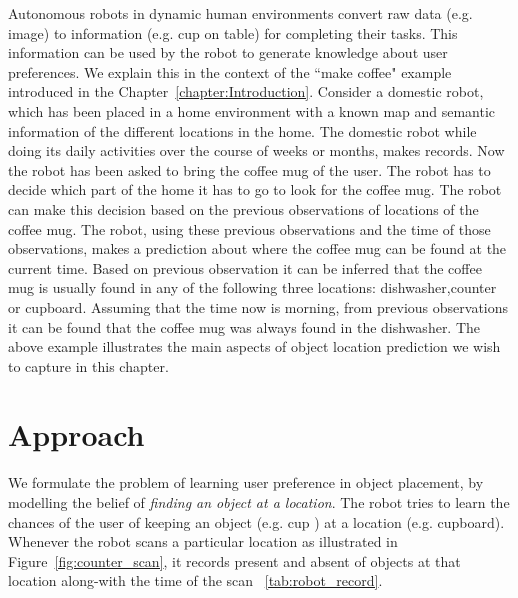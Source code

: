 Autonomous robots in dynamic human environments convert raw data  (e.g. image) to information  (e.g. cup on table) for completing their tasks. This information can be used by the robot to generate knowledge about user preferences. We explain this in the context of the ``make coffee" example introduced in the Chapter~\ref{chapter:Introduction}. 
Consider a domestic robot, which has been placed in a home environment with a known map and semantic information of the different locations in the home. The domestic robot while doing its daily activities over the course of weeks or months, makes records. Now the robot has been asked to bring the coffee mug of the user.
The robot has to decide which part of the home it has to go to look for
the coffee mug. The robot can make this decision based on the previous observations of locations of the coffee mug.
The robot, using these previous observations and the time of those observations,
makes a prediction about where the coffee mug can be found at the current time.
Based on previous observation it can be inferred that the coffee mug is usually found in any of the following three locations: dishwasher,counter or cupboard. Assuming that the time now is morning, from previous observations it can be found that the coffee mug was always found  in the dishwasher. The above example illustrates the main aspects of object location prediction we wish to capture in this chapter.

\section{Approach}

We formulate the problem of learning user preference in object placement, by modelling the belief of \emph{finding an object at a location}. The robot tries to learn the chances of the user of keeping an object  (e.g. cup ) at a location  (e.g. cupboard). Whenever the robot scans a particular location as illustrated in Figure~\ref{fig:counter_scan}, it records present and absent of objects at that location along-with the time of the scan ~\ref{tab:robot_record}.
  
